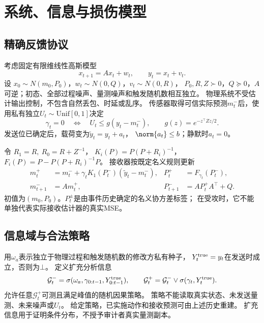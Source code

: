 \section{系统、信息与损伤模型}
\subsection{精确反馈协议}
考虑固定有限维线性高斯模型
\begin{equation}
x_{t+1}=Ax_t+w_t,\qquad y_t=x_t+v_t .
\label{eq:model}
\end{equation}
设 $x_0\sim N(m_0,P_0)$，$w_t\sim N(0,Q)$，$v_t\sim N(0,R)$，
$P_0,R,Z\succ0$，$Q\succeq0$，$A$可逆；初态、全部过程噪声、量测噪声和触发随机数相互独立。
物理系统不受估计输出控制，不包含自然丢包、时延或乱序。
传感器取得可信实际预测$m_t^-$后，使用私有独立$U_t\sim\mathrm{Unif}[0,1]$决定
\begin{equation}
\gamma_t=0\quad\Longleftrightarrow\quad
U_t\le g(y_t-m_t^-),\qquad g(z)=e^{-z^\top Zz/2}.
\label{eq:trigger}
\end{equation}
发送位已确定后，载荷变为$\tilde y_t=y_t+a_t$，
$\norm{a_t}\le b$；静默时$a_t=0$。

令 $R_1=R,\ R_0=R+Z^{-1}$，
$K_i(P)=P(P+R_i)^{-1}$，$F_i(P)=P-P(P+R_i)^{-1}P$。
接收器按既定名义规则更新
\begin{align}
m_t^+&=m_t^-+\gamma_tK_1(P_t^-)(\tilde y_t-m_t^-),&
P_t^+&=F_{\gamma_t}(P_t^-),\label{eq:receive}\\
m_{t+1}^-&=Am_t^+,& P_{t+1}^-&=AP_t^+A^\top+Q.\nonumber
\end{align}
初值为$(m_0,P_0)$。$P_t^\pm$是由事件历史确定的名义协方差标签；
在受攻时，它不能单独代表实际接收估计器的真实MSE。

\subsection{信息域与合法策略}
用$\omega_a$表示独立于物理过程和触发随机数的修改方私有种子，
$Y_t^{\rm true}=y_t$在发送时成立，否则为$\bot$。
定义扩充分析信息
\[
\mathcal G_t^-=\sigma(\omega_a,\gamma_{0:t-1},Y^{\rm true}_{0:t-1}),\qquad
\mathcal G_t^+=\mathcal G_t^-\vee\sigma(\gamma_t,Y_t^{\rm true}).
\]
允许任意$\mathcal G_t^+$可测且满足峰值的随机因果策略。
策略不能读取真实状态、未发送量测、未来噪声或$U_t$。
给定策略，已实施动作和接收预测可由上述历史重建。
扩充信息用于证明条件分布，不授予审计者真实量测副本。

